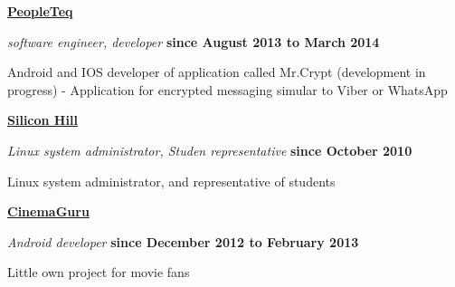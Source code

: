\documentclass[10pt]{article}
\newenvironment{outerlist}[0]%
        {\begin{itemize}}
        {\end{itemize}
         \vspace{-.6\baselineskip}}
\newenvironment{innerlist}[0]%
        {\begin{compactitem}}
        {\end{compactitem}}
\newcommand{\blankline}{\quad\pagebreak[2]}
\begin{document}
\blankline


\href{http://www.peopleteq.com/}{\textbf{PeopleTeq}}
\begin{outerlist}
  \item[] \textit{software engineer, developer}%
          \hfill \textbf{since August 2013 to March 2014}
  \begin{innerlist}
    \item Android and IOS developer of application called Mr.Crypt (development in progress) - Application for encrypted messaging simular to Viber or WhatsApp
  \end{innerlist}
\end{outerlist}

\blankline

\href{http://www.siliconhill.cz/}{\textbf{Silicon Hill}}
\begin{outerlist}
  \item[] \textit{Linux system administrator, Studen representative}%
        \hfill \textbf{since October 2010}
  \begin{innerlist}
    \item Linux system administrator, and representative of students
  \end{innerlist}
\end{outerlist}

\blankline

\href{https://play.google.com/store/apps/details?id=beretis.cinemaguru&hl=cs}{\textbf{CinemaGuru}}
\begin{outerlist}
  \item[] \textit{Android developer}
        \hfill \textbf{since December 2012 to February 2013} \\ 
  \begin{innerlist}
    \item Little own project for movie fans
  \end{innerlist}
\end{outerlist}

\blankline
\end{document}
